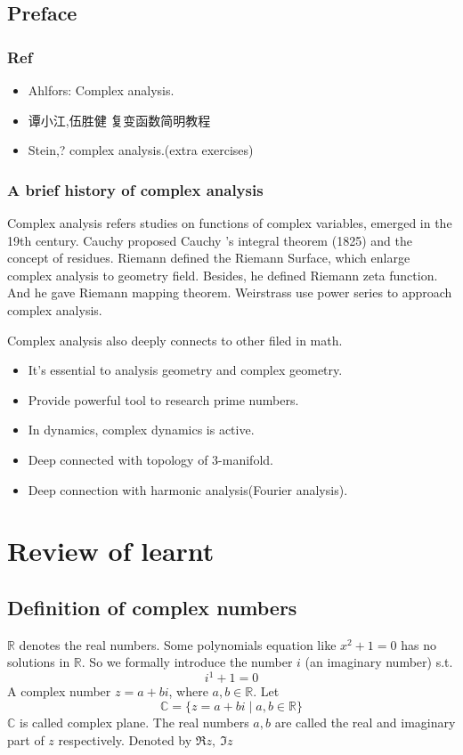 \documentclass{book}
\begin{document}
\tableofcontents
\chapter{Preface}
\section{Ref}
\begin{itemize}
    \item Ahlfors: Complex analysis.
    \item 谭小江,伍胜健 复变函数简明教程
    \item Stein,? complex analysis.(extra exercises)
\end{itemize}
\section{A brief history of complex analysis}
Complex analysis refers studies on functions of complex variables, emerged in the 19th century. Cauchy proposed Cauchy 's integral theorem (1825) and the concept of residues. Riemann defined the Riemann Surface, which enlarge complex analysis to geometry field. Besides, he defined Riemann zeta function. And he gave Riemann mapping theorem. Weirstrass use power series to approach complex analysis.

Complex analysis also deeply connects to other filed in math.
\begin{itemize}
    \item It's essential to analysis geometry and complex geometry.
    \item Provide powerful tool to research prime numbers.
    \item In dynamics, complex dynamics is active.
    \item Deep connected with topology of 3-manifold.
    \item Deep connection with harmonic analysis(Fourier analysis).
\end{itemize}
\part{Review of learnt}
\chapter{Definition of complex numbers}
$\mathbb{R}$ denotes the real numbers. Some polynomials equation like $x^2+1=0$ has no solutions in $\mathbb{R}$. So we formally introduce the number $i$ (an imaginary number) s.t.$$i^1+1=0$$
A complex number $z=a+bi$, where $a,b\in \mathbb{R}$. Let $$\mathbb C=\{z=a+bi\mid a,b\in \mathbb R\}$$ 
$\mathbb C$ is called complex plane. The real numbers $a,b$ are called the real and imaginary part of $z$ respectively. Denoted by $\Re z,\ \Im z$
\end{document}
